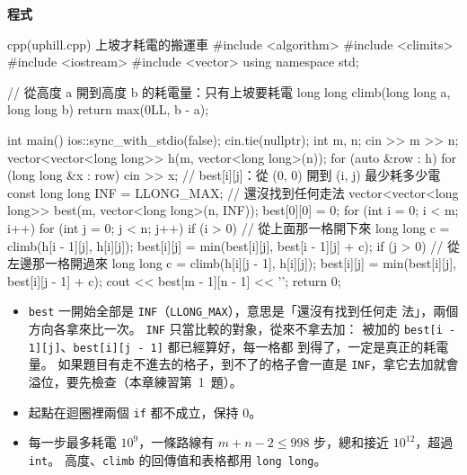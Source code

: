 \textbf{程式}

\begin{example}[label=ex:dp2-uphill]{cpp}{(uphill.cpp) 上坡才耗電的搬運車}
#include <algorithm>
#include <climits>
#include <iostream>
#include <vector>
using namespace std;

// 從高度 a 開到高度 b 的耗電量：只有上坡要耗電
long long climb(long long a, long long b) {
    return max(0LL, b - a);
}

int main() {
    ios::sync_with_stdio(false);
    cin.tie(nullptr);
    int m, n;
    cin >> m >> n;
    vector<vector<long long>> h(m, vector<long long>(n));
    for (auto &row : h) {
        for (long long &x : row) {
            cin >> x;
        }
    }
    // best[i][j]：從 (0, 0) 開到 (i, j) 最少耗多少電
    const long long INF = LLONG_MAX;     // 還沒找到任何走法
    vector<vector<long long>> best(m, vector<long long>(n, INF));
    best[0][0] = 0;
    for (int i = 0; i < m; i++) {
        for (int j = 0; j < n; j++) {
            if (i > 0) {                    // 從上面那一格開下來
                long long c = climb(h[i - 1][j], h[i][j]);
                best[i][j] = min(best[i][j], best[i - 1][j] + c);
            }
            if (j > 0) {                    // 從左邊那一格開過來
                long long c = climb(h[i][j - 1], h[i][j]);
                best[i][j] = min(best[i][j], best[i][j - 1] + c);
            }
        }
    }
    cout << best[m - 1][n - 1] << '\n';
    return 0;
}
\end{example}


\begin{itemize}
\item \texttt{best} 一開始全部是 \texttt{INF}（\texttt{LLONG\_MAX}），意思是「還沒有找到任何走
法」，兩個方向各拿來比一次。 \texttt{INF} 只當比較的對象，從來不拿去加：
被加的 \texttt{best[i - 1][j]}、\texttt{best[i][j - 1]} 都已經算好，每一格都
到得了，一定是真正的耗電量。 如果題目有走不進去的格子，到不了的格子會一直是
\texttt{INF}，拿它去加就會溢位，要先檢查（本章練習第~1~題）。
\item 起點在迴圈裡兩個 \texttt{if} 都不成立，保持 $0$。
\item 每一步最多耗電 $10^9$，一條路線有 $m + n - 2 \le 998$ 步，總和接近
$10^{12}$，超過 \texttt{int}。 高度、\texttt{climb} 的回傳值和表格都用
\texttt{long long}。
\end{itemize}

